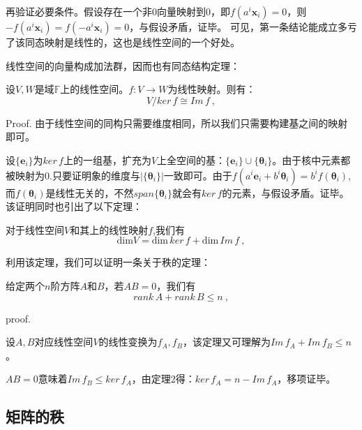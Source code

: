 再验证必要条件。假设存在一个非$0$向量映射到$0$，即$f(a^i\boldsymbol x_i)=0$，则$-f(a^i\boldsymbol x_i)=f(-a^i\boldsymbol x_i)=0$，与假设矛盾，证毕。
可见，第一条结论能成立多亏了该同态映射是线性的，这也是线性空间的一个好处。

线性空间的向量构成加法群，因而也有同态结构定理：
\begin{theorem}{}
设$V,W$是域$\mathbb F$上的线性空间。$f:V\rightarrow W$为线性映射。则有：
\begin{equation}
V/ker \,f\cong Im\,f~,
\end{equation}
\end{theorem}
Proof.
由于线性空间的同构只需要维度相同，所以我们只需要构建基之间的映射即可。

设$\{\boldsymbol e_i\}$为$ker\,f$上的一组基，扩充为$V$上全空间的基：$\{\boldsymbol e_i\}\cup \{\boldsymbol \theta_i\}$。由于核中元素都被映射为0.只要证明象的维度与$|\{\boldsymbol \theta_i\}|$一致即可。由于$f(a^i\boldsymbol e_i+b^i\boldsymbol \theta_i)=b^if(\boldsymbol \theta_i)$,而$f(\boldsymbol \theta_i)$是线性无关的，不然$span\{\boldsymbol \theta_i\}$就会有$ker\,f$的元素，与假设矛盾。证毕。
该证明同时也引出了以下定理：
\begin{lemma}{}
对于线性空间$V$和其上的线性映射$f$,我们有
$$\mathrm{dim}V=\mathrm{dim}\,ker\,f+\mathrm {dim}\,Im\,f~,$$
\end{lemma}
利用该定理，我们可以证明一条关于秩的定理：
\begin{theorem}{}
给定两个$n$阶方阵$A$和$B$，若$AB=0$，我们有
\begin{equation}
rank\,A+rank\,B\le n~,
\end{equation}
\end{theorem}
proof.

设$A,B$对应线性空间$V$的线性变换为$f_A,f_B$，该定理又可理解为$Im\,f_A+Im\,f_B\le n$。

$AB=0$意味着$Im\,f_B\le ker\,f_A$，由定理2得：$ker\,f_A=n-Im\,f_A$，移项证毕。
\subsection{矩阵的秩}